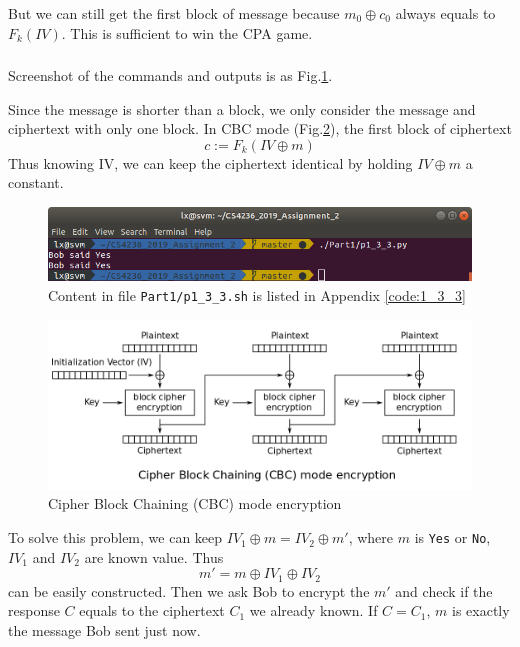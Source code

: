 But we can still get the first block of message because $m_0 \oplus c_0$ always equals to $F_k(IV)$. This is sufficient to win the CPA game.

\subsubsection{}

Screenshot of the commands and outputs is as Fig.\ref{fig:p1_3_3}.

Since the message is shorter than a block, we only consider the message and ciphertext with only one block.
In CBC mode (Fig.\ref{fig:CBC_encryption}), the first block of ciphertext 
$$c := F_k(IV \oplus m)$$
Thus knowing IV, we can keep the ciphertext identical by holding $IV \oplus m$ a constant.

\begin{figure}[t!]
\centering
\includegraphics[width=\columnwidth]{pictures/p1_3_3.png}
\caption{
    Content in file \texttt{Part1/p1\_3\_3.sh} is listed in Appendix \ref{code:1_3_3}
}
\label{fig:p1_3_3}
\end{figure}

\begin{figure}[ht]
\centering
\includegraphics[width=\columnwidth]{pictures/CBC_encryption.png}
\caption{
    Cipher Block Chaining (CBC) mode encryption \protect\footnotemark
}
\label{fig:CBC_encryption}
\end{figure}


To solve this problem, we can keep $IV_1 \oplus m = IV_2 \oplus m'$, where $m$ is \texttt{Yes} or \texttt{No}, $IV_1$ and $IV_2$ are known value. Thus
$$ m' = m \oplus IV_1 \oplus IV_2 $$
can be easily constructed. Then we ask Bob to encrypt the $m'$ and check if the response $C$ equals to the ciphertext $C_1$ we already known. If $C = C_1$, $m$ is exactly the message Bob sent just now.
